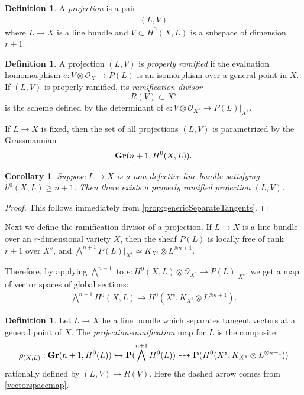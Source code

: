 \documentclass[11pt,reqno]{amsart}
\theoremstyle{plain}
\newtheorem{corollary}[theorem]{Corollary}
\theoremstyle{definition}
\newtheorem{definition}[theorem]{Definition}
\theoremstyle{remark}
\numberwithin{equation}{section}
\newcommand{\cO}{{\mathcal O}}
\renewcommand{\to}{{\longrightarrow}}
\numberwithin{equation}{section}
\begin{document}
\begin{definition}
A {\sl projection} is a pair 
\begin{align*}
  (L,V)
\end{align*}
where  $L \to X$ is a line bundle and $V \subset H^{0}(X,L)$ is a subspace of dimension $r+1$.  
\end{definition}

\begin{definition}
  \label{definition:properlyramified}
  A projection $(L,V)$ is {\sl properly ramified} if the evaluation homomorphism $e: V \otimes \cO_{X} \to P(L)$ is an isomorphism over a general point in $X$.  If $(L,V)$ is properly ramified, its {\sl ramification divisor} $$R(V) \subset X^{s}$$ is the scheme defined by the determinant of $e : V \otimes \cO_{X^{s}} \to P(L)|_{X^{s}}$.
\end{definition}

If $L \to X$ is fixed, then the set of all projections $(L,V)$ is parametrized by the Grassmannian 
\begin{align*}
  {\bf Gr}(n+1, H^{0}(X,L)).
\end{align*}

\begin{corollary}\label{cor:properlyramified}
  Suppose $L \to X$ is a non-defective line bundle  satisfying $h^{0}(X,L) \geq n+1$. Then there exists a properly ramified projection $(L,V)$.
\end{corollary}

\begin{proof}
  This follows immediately from \autoref{prop:genericSeparateTangents}.
\end{proof}

Next we define the ramification divisor of a projection.  If $L \to X$ is a line bundle over an $r$-dimensional variety $X$, then the sheaf $P(L)$ is locally free of rank $r+1$ over $X^{s}$, and $\bigwedge^{n+1}P(L)|_{X^{s}} \simeq K_{X^{s}} \otimes L^{\otimes n+1}$.  

Therefore, by applying $\bigwedge^{n+1}$ to $e : H^{0}(X,L) \otimes \cO_{X^{s}} \to P(L)|_{X^{s}}$, we get a map of vector spaces of global sections: 
\begin{align}\label{vectorspacemap}
\bigwedge^{n+1}H^{0}(X,L) \to H^{0}(X^{s},K_{X^{s}} \otimes L^{\otimes n+1}).
\end{align}



\begin{definition}
  \label{def:ProjectionRamification}
  Let $L \to X$ be a line bundle which separates tangent vectors at a general point of $X$. The {\sl projection-ramification} map for $L$ is the composite: 
  \begin{align*}
    \rho_{(X,L)}: {\bf Gr}(n+1,H^{0}(L)) \hookrightarrow {\bf P}(\bigwedge^{n+1}H^{0}(L)) \dashrightarrow {\bf P}(H^{0}(X^{s}, K_{X^{s}} \otimes L^{\otimes n+1}))
  \end{align*}
  rationally defined by $(L,V) \mapsto R(V)$. Here the dashed arrow comes from \ref{vectorspacemap}.
\end{definition}
\end{document}
